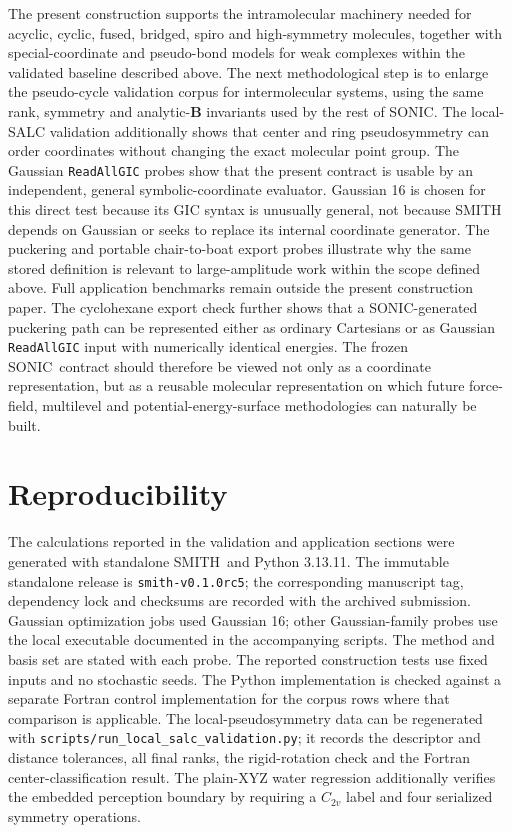 \documentclass[journal=jctcce,manuscript=article,layout=traditional]{achemso}
\newcommand{\SONIC}{SONIC}
\newcommand{\SMITH}{\textsc{SMITH}}
\newcommand{\Bmat}{\mathbf{B}}
\theoremstyle{definition}
\begin{document}
The present construction supports the intramolecular machinery needed for
acyclic, cyclic, fused, bridged, spiro and high-symmetry molecules, together
with special-coordinate and pseudo-bond models for weak complexes within the
validated baseline described above.  The next methodological step is to enlarge
the pseudo-cycle validation corpus for intermolecular systems, using the same
rank, symmetry and analytic-\(\Bmat\) invariants used by the rest of \SONIC.
The local-SALC validation additionally shows that center and ring
pseudosymmetry can order coordinates without changing the exact molecular
point group.  The Gaussian \texttt{ReadAllGIC} probes show that the present
contract is usable by an independent, general symbolic-coordinate evaluator.
Gaussian 16 is chosen for this direct test because its GIC syntax is unusually
general, not because SMITH depends on Gaussian or seeks to replace its internal
coordinate generator.
The puckering and portable chair-to-boat export probes illustrate why the same
stored definition is relevant to large-amplitude work within the scope defined
above.  Full application benchmarks remain outside the present construction
paper.  The cyclohexane export check further shows
that a \SONIC{}-generated puckering path can be represented either as ordinary
Cartesians or as Gaussian \texttt{ReadAllGIC} input with numerically identical
energies.  The frozen \SONIC\ contract should therefore be viewed not only as a
coordinate representation, but as a reusable molecular representation on which
future force-field, multilevel and potential-energy-surface methodologies can
naturally be built.

\section*{Reproducibility}

The calculations reported in the validation and application sections were
generated with standalone \SMITH\ and Python 3.13.11.  The immutable standalone
release is \texttt{smith-v0.1.0rc5}; the corresponding manuscript tag,
dependency lock and checksums are recorded with the archived submission.  Gaussian
optimization jobs used Gaussian 16; other Gaussian-family probes use the local
executable documented in the accompanying scripts.  The method and basis set
are stated with each probe.  The reported
construction tests use fixed inputs and no stochastic seeds.  The
Python implementation is checked against a separate Fortran control
implementation for the corpus rows where that comparison is applicable.  The
local-pseudosymmetry data can be regenerated with
\texttt{scripts/run\_local\_salc\_validation.py}; it records the descriptor and
distance tolerances, all final ranks, the rigid-rotation check and the
Fortran center-classification result.
The plain-XYZ water regression additionally verifies the embedded perception
boundary by requiring a $C_{2v}$ label and four serialized symmetry operations.
\end{document}
